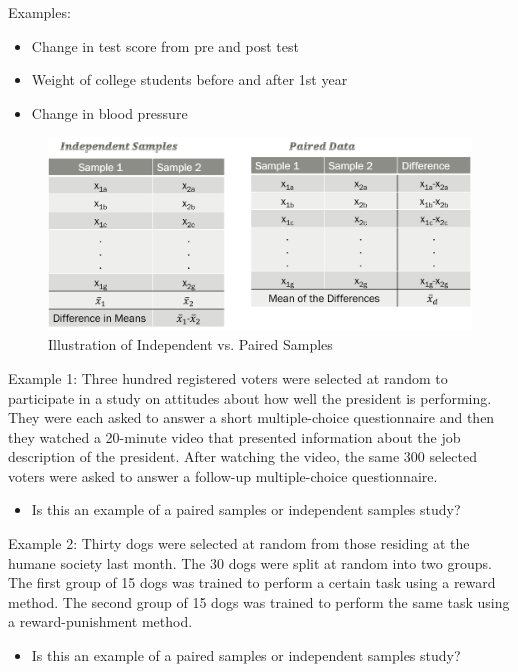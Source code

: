 \documentclass[
]{report}
\providecommand{\tightlist}{%
  \setlength{\itemsep}{0pt}\setlength{\parskip}{0pt}}
\begin{document}
Examples:

\begin{itemize}
\item
  Change in test score from pre and post test
\item
  Weight of college students before and after 1st year
\item
  Change in blood pressure
\end{itemize}

\begin{figure}

{\centering \includegraphics[width=0.6\linewidth]{images/paired_independent} 

}

\caption{Illustration of Independent vs. Paired Samples}\label{fig:pairedindependent}
\end{figure}

Example 1: Three hundred registered voters were selected at random to participate in a study on attitudes about how well the president is performing. They were each asked to answer a short multiple-choice questionnaire and then they watched a 20-minute video that presented information about the job description of the president. After watching the video, the same 300 selected voters were asked to answer a follow-up multiple-choice questionnaire.

\begin{itemize}
\tightlist
\item
  Is this an example of a paired samples or independent samples study?
\end{itemize}

\vspace{0.3in}

\newpage

Example 2: Thirty dogs were selected at random from those residing at the humane society last month. The 30 dogs were split at random into two groups. The first group of 15 dogs was trained to perform a certain task using a reward method. The second group of 15 dogs was trained to perform the same task using a reward-punishment method.

\begin{itemize}
\tightlist
\item
  Is this an example of a paired samples or independent samples study?
\end{itemize}
\end{document}
